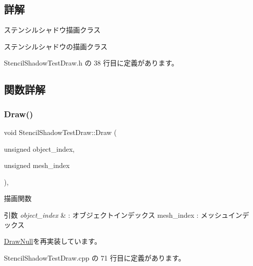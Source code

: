 \subsection{詳解}
ステンシルシャドウ描画クラス 

ステンシルシャドウの描画クラス 

 Stencil\+Shadow\+Test\+Draw.\+h の 38 行目に定義があります。



\subsection{関数詳解}
\mbox{\label{class_stencil_shadow_test_draw_abb5f9445b7d94c213a3751fa57e36643}} 
\subsubsection{\texorpdfstring{Draw()}{Draw()}}
{\footnotesize\ttfamily void Stencil\+Shadow\+Test\+Draw\+::\+Draw (\begin{DoxyParamCaption}\item[{unsigned}]{object\+\_\+index,  }\item[{unsigned}]{mesh\+\_\+index }\end{DoxyParamCaption})\hspace{0.3cm}{\ttfamily [override]}, {\ttfamily [virtual]}}



描画関数 


\begin{DoxyParams}{引数}
{\em object\+\_\+index} & \+: オブジェクトインデックス mesh\+\_\+index \+: メッシュインデックス \\
\hline
\end{DoxyParams}


\mbox{\hyperlink{class_draw_null_afe50f6fd820b18d673f70f048743f339}{Draw\+Null}}を再実装しています。



 Stencil\+Shadow\+Test\+Draw.\+cpp の 71 行目に定義があります。

\mbox{\label{class_stencil_shadow_test_draw_a285b3045ff5cc34b6b2b991cca434bb3}} 
